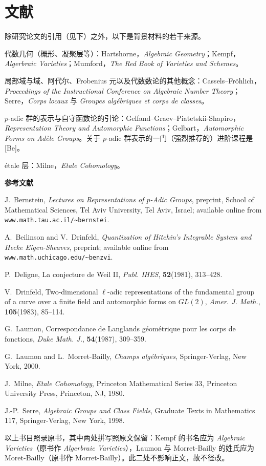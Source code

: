 \chapter*{文献}

除研究论文的引用（见下）之外，以下是背景材料的若干来源。

代数几何（概形、凝聚层等）：Hartshorne，\emph{Algebraic Geometry}；Kempf，\emph{Algerbraic Varieties}；Mumford，\emph{The Red Book of Varieties and Schemes}。

局部域与域、阿代尔、Frobenius 元以及代数数论的其他概念：Cassels--Fr\"ohlich，\emph{Proceedings of the Instructional Conference on Algebraic Number Theory}；Serre，\emph{Corps locaux} 与 \emph{Groupes alg\'ebriques et corps de classes}。

$p$-adic 群的表示与自守函数论的引论：Gelfand--Graev--Piatetskii-Shapiro，\emph{Representation Theory and Automorphic Functions}；Gelbart，\emph{Automorphic Forms on Ad\`ele Groups}。关于 $p$-adic 群表示的一门（强烈推荐的）进阶课程是 [Be]。

\'etale 层：Milne，\emph{Etale Cohomology}。

\bigskip
\noindent\textbf{参考文献}

\begin{description}[leftmargin=3.6em, labelwidth=3.1em, labelsep=0.5em, itemsep=0.5em]
\item[{[Be]}] J.~Bernstein, \emph{Lectures on Representations of $p$-Adic Groups}, preprint, School of Mathematical Sciences, Tel Aviv University, Tel Aviv, Israel; available online from \texttt{www.math.tau.ac.il/\textasciitilde bernstei}.
\item[{[BD]}] A.~Beilinson and V.~Drinfeld, \emph{Quantization of Hitchin's Integrable System and Hecke Eigen-Sheaves}, preprint; available online from \texttt{www.math.uchicago.edu/\textasciitilde benzvi}.
\item[{[De]}] P.~Deligne, La conjecture de Weil II, \emph{Publ. IHES}, \textbf{52}(1981), 313--428.
\item[{[Dr]}] V.~Drinfeld, Two-dimensional $\ell$-adic representations of the fundamental group of a curve over a finite field and automorphic forms on $GL(2)$, \emph{Amer. J. Math.}, \textbf{105}(1983), 85--114.
\item[{[L]}] G.~Laumon, Correspondance de Langlands g\'eom\'etrique pour les corps de fonctions, \emph{Duke Math. J.}, \textbf{54}(1987), 309--359.
\item[{[L-MB]}] G.~Laumon and L.~Morret-Bailly, \emph{Champs alg\'ebriques}, Springer-Verlag, New York, 2000.
\item[{[Mi]}] J.~Milne, \emph{Etale Cohomology}, Princeton Mathematical Series 33, Princeton University Press, Princeton, NJ, 1980.
\item[{[Se]}] J.-P.~Serre, \emph{Algebraic Groups and Class Fields}, Graduate Texts in Mathematics 117, Springer-Verlag, New York, 1998.
\end{description}

\begin{annote}
以上书目照录原书，其中两处拼写照原文保留：Kempf 的书名应为 \emph{Algebraic Varieties}（原书作 \emph{Algerbraic Varieties}），Laumon 与 Morret-Bailly 的姓氏应为 Moret-Bailly（原书作 Morret-Bailly）。此二处不影响正文，故不径改。\par\vspace{0.15em}{\raggedleft 【来源：原书 p.280--281（A）；书目核对（B）】\par}
\end{annote}
